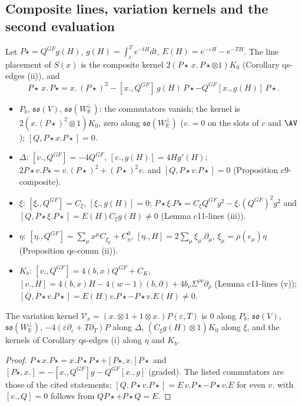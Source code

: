 \subsection{Composite lines, variation kernels and the second evaluation}

\begin{proposition}
\label{prop:at-composite}
Let $P\star=Q^{GF}g(H)$, $g(H)=\int_\varepsilon^Te^{-tH}dt$, $E(H)=e^{-\varepsilon H}-e^{-TH}$. The line placement of $S(x)$ is the composite kernel $2(P\star\,x.\,P\star\otimes1)K_0$ (Corollary qs-edges (ii)), and
\[
P\star\,x.\,P\star=x.\,(P\star)^2-[x.,Q^{GF}]\,g(H)\,P\star-Q^{GF}[x.,g(H)]\,P\star .
\]
\begin{itemize}
\item $P_b$, $\mathfrak{so}(V)$, $\mathfrak{so}(W^\perp_{\mathbb R})$: the commutators vanish; the kernel is $2(x.(P\star)^2\otimes1)K_0$, zero along $\mathfrak{so}(W^\perp_{\mathbb R})$ ($v.=0$ on the slots of $c$ and $\AV$); $[Q,P\star x.P\star]=0$.
\item $\Delta$: $[v.,Q^{GF}]=-4Q^{GF}$, $[v.,g(H)]=4Hg'(H)$; $2P\star v.P\star=v.(P\star)^2+(P\star)^2v.$ and $[Q,P\star v.P\star]=0$ (Proposition c9-composite).
\item $\xi$: $[\xi.,Q^{GF}]=C_\xi$, $[\xi.,g(H)]=0$; $P\star\xi.P\star=C_\xi Q^{GF}g^2-\xi.(Q^{GF})^2g^2$ and $[Q,P\star\xi.P\star]=E(H)C_\xi g(H)\ne0$ (Lemma c11-lines (iii)).
\item $\eta$: $[\eta.,Q^{GF}]=\sum_\mu x^\mu C_{\xi_\mu}+C^0_\eta$, $[\eta.,H]=2\sum_\mu\xi_\mu.\partial_\mu$, $\xi_\mu=\rho(e_\mu)\eta$ (Proposition qs-comm (ii)).
\item $K_b$: $[v.,Q^{GF}]=4(b,x)Q^{GF}+C_K$, $[v.,H]=4(b,x)H-4(w-1)(b,\partial)+4b_\nu\Sigma^{\rho\nu}\partial_\rho$ (Lemma c11-lines (v)); $[Q,P\star v.P\star]=E(H)v.P\star-P\star v.E(H)\ne0$.
\end{itemize}
The variation kernel $\mathcal V_x=(x.\otimes1+1\otimes x.)P(\varepsilon,T)$ is $0$ along $P_b$, $\mathfrak{so}(V)$, $\mathfrak{so}(W^\perp_{\mathbb R})$, $-4(\varepsilon\partial_\varepsilon+T\partial_T)P$ along $\Delta$, $(C_\xi g(H)\otimes1)K_0$ along $\xi$, and the kernels of Corollary qs-edges (i) along $\eta$ and $K_b$.
\end{proposition}

\begin{proof}
$P\star x.P\star=x.P\star P\star+[P\star,x.]P\star$ and $[P\star,x.]=-[x.,Q^{GF}]g-Q^{GF}[x.,g]$ (graded). The listed commutators are those of the cited statements; $[Q,P\star v.P\star]=E\,v.P\star-P\star v.E$ for even $v.$ with $[v.,Q]=0$ follows from $QP\star+P\star Q=E$.
\end{proof}

